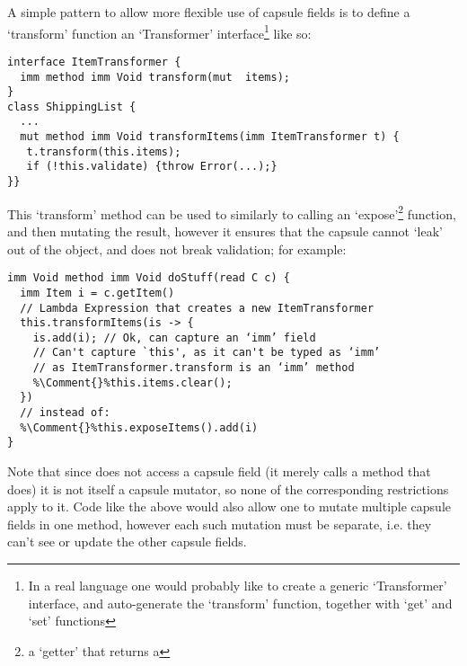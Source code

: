 \loseSpace
A simple pattern to allow more flexible use of capsule fields is to define a ‘transform’ function an ‘Transformer’ interface\footnote{In a real language one would probably like to create a generic ‘Transformer’ interface, and auto-generate the ‘transform’ function, together with ‘get’ and ‘set’ functions} like so:
\saveSpace
\begin{lstlisting}
interface ItemTransformer { 
  imm method imm Void transform(mut  items);
}
class ShippingList {
  ...
  mut method imm Void transformItems(imm ItemTransformer t) {
   t.transform(this.items);
   if (!this.validate) {throw Error(...);}
}}
\end{lstlisting}
This ‘transform’ method can be used to similarly to calling an ‘expose’\footnote{a ‘getter’ that returns a \Q@mut@} function, and then mutating the result, however it ensures that the capsule cannot ‘leak’ out of the object, and does not break validation; for example:
\begin{lstlisting}[escapechar=\%]
imm Void method imm Void doStuff(read C c) {
  imm Item i = c.getItem()
  // Lambda Expression that creates a new ItemTransformer
  this.transformItems(is -> {
    is.add(i); // Ok, can capture an ‘imm’ field
    // Can't capture `this', as it can't be typed as ‘imm’
    // as ItemTransformer.transform is an ‘imm’ method
    %\Comment{}%this.items.clear();
  })
  // instead of:
  %\Comment{}%this.exposeItems().add(i)
}
\end{lstlisting}
Note that since \Q@doStuff@ does not access a capsule field (it merely calls a method that does) it is not itself a capsule mutator, so none of the corresponding restrictions apply to it. Code like the above would also allow one to mutate multiple capsule fields in one method, however each such mutation must be separate,  i.e. they can't see or update the other capsule fields.